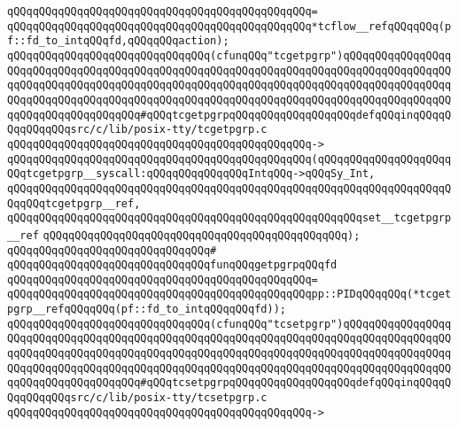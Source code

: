 \verb|qQQqqQQqqQQqqQQqqQQqqQQqqQQqqQQqqQQqqQQqqQQqqQQq=|\newline
\verb|qQQqqQQqqQQqqQQqqQQqqQQqqQQqqQQqqQQqqQQqqQQqqQQq*tcflow__refqQQqqQQq(pf::fd_to_intqQQqfd,qQQqqQQqaction);|\newline
\newline
\newline
\verb|qQQqqQQqqQQqqQQqqQQqqQQqqQQqqQQq(cfunqQQq"tcgetpgrp")qQQqqQQqqQQqqQQqqQQqqQQqqQQqqQQqqQQqqQQqqQQqqQQqqQQqqQQqqQQqqQQqqQQqqQQqqQQqqQQqqQQqqQQqqQQqqQQqqQQqqQQqqQQqqQQqqQQqqQQqqQQqqQQqqQQqqQQqqQQqqQQqqQQqqQQqqQQqqQQqqQQqqQQqqQQqqQQqqQQqqQQqqQQqqQQqqQQqqQQqqQQqqQQqqQQqqQQqqQQqqQQqqQQqqQQqqQQqqQQqqQQqqQQq#qQQqtcgetpgrpqQQqqQQqqQQqqQQqqQQqdefqQQqinqQQqqQQqqQQqqQQqsrc/c/lib/posix-tty/tcgetpgrp.c|\newline
\verb|qQQqqQQqqQQqqQQqqQQqqQQqqQQqqQQqqQQqqQQqqQQqqQQq->|\newline
\verb|qQQqqQQqqQQqqQQqqQQqqQQqqQQqqQQqqQQqqQQqqQQqqQQq(qQQqqQQqqQQqqQQqqQQqqQQqtcgetpgrp__syscall:qQQqqQQqqQQqqQQqIntqQQq->qQQqSy_Int,|\newline
\verb|qQQqqQQqqQQqqQQqqQQqqQQqqQQqqQQqqQQqqQQqqQQqqQQqqQQqqQQqqQQqqQQqqQQqqQQqqQQqtcgetpgrp__ref,|\newline
\verb|qQQqqQQqqQQqqQQqqQQqqQQqqQQqqQQqqQQqqQQqqQQqqQQqqQQqqQQqset__tcgetpgrp__ref|\newline
\verb|qQQqqQQqqQQqqQQqqQQqqQQqqQQqqQQqqQQqqQQqqQQqqQQq);|\newline
\verb|qQQqqQQqqQQqqQQqqQQqqQQqqQQqqQQq#|\newline
\verb|qQQqqQQqqQQqqQQqqQQqqQQqqQQqqQQqfunqQQqgetpgrpqQQqfd|\newline
\verb|qQQqqQQqqQQqqQQqqQQqqQQqqQQqqQQqqQQqqQQqqQQqqQQq=|\newline
\verb|qQQqqQQqqQQqqQQqqQQqqQQqqQQqqQQqqQQqqQQqqQQqqQQqpp::PIDqQQqqQQq(*tcgetpgrp__refqQQqqQQq(pf::fd_to_intqQQqqQQqfd));|\newline
\newline
\newline
\verb|qQQqqQQqqQQqqQQqqQQqqQQqqQQqqQQq(cfunqQQq"tcsetpgrp")qQQqqQQqqQQqqQQqqQQqqQQqqQQqqQQqqQQqqQQqqQQqqQQqqQQqqQQqqQQqqQQqqQQqqQQqqQQqqQQqqQQqqQQqqQQqqQQqqQQqqQQqqQQqqQQqqQQqqQQqqQQqqQQqqQQqqQQqqQQqqQQqqQQqqQQqqQQqqQQqqQQqqQQqqQQqqQQqqQQqqQQqqQQqqQQqqQQqqQQqqQQqqQQqqQQqqQQqqQQqqQQqqQQqqQQqqQQqqQQqqQQqqQQq#qQQqtcsetpgrpqQQqqQQqqQQqqQQqqQQqdefqQQqinqQQqqQQqqQQqqQQqsrc/c/lib/posix-tty/tcsetpgrp.c|\newline
\verb|qQQqqQQqqQQqqQQqqQQqqQQqqQQqqQQqqQQqqQQqqQQqqQQq->|\newline
